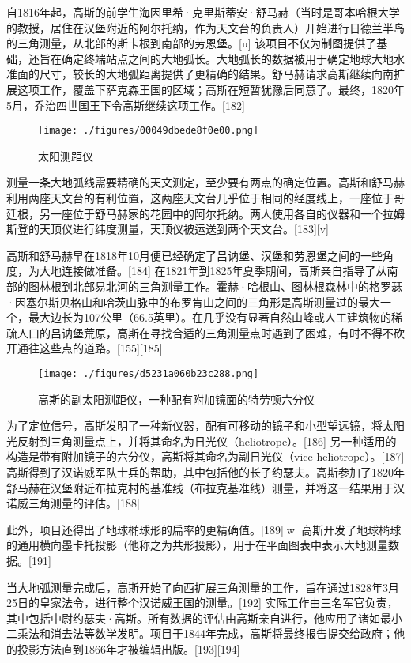 自1816年起，高斯的前学生海因里希·克里斯蒂安·舒马赫（当时是哥本哈根大学的教授，居住在汉堡附近的阿尔托纳，作为天文台的负责人）开始进行日德兰半岛的三角测量，从北部的斯卡根到南部的劳恩堡。[u] 该项目不仅为制图提供了基础，还旨在确定终端站点之间的大地弧长。大地弧长的数据被用于确定地球大地水准面的尺寸，较长的大地弧距离提供了更精确的结果。舒马赫请求高斯继续向南扩展这项工作，覆盖下萨克森王国的区域；高斯在短暂犹豫后同意了。最终，1820年5月，乔治四世国王下令高斯继续这项工作。[182]
\begin{figure}[ht]
\centering
\texttt{[image: ./figures/00049dbede8f0e00.png]}
\caption{太阳测距仪} \label{fig_KRGS_17}
\end{figure}
测量一条大地弧线需要精确的天文测定，至少要有两点的确定位置。高斯和舒马赫利用两座天文台的有利位置，这两座天文台几乎位于相同的经度线上，一座位于哥廷根，另一座位于舒马赫家的花园中的阿尔托纳。两人使用各自的仪器和一个拉姆斯登的天顶仪进行纬度测量，天顶仪被运送到两个天文台。[183][v]

高斯和舒马赫早在1818年10月便已经确定了吕讷堡、汉堡和劳恩堡之间的一些角度，为大地连接做准备。[184] 在1821年到1825年夏季期间，高斯亲自指导了从南部的图林根到北部易北河的三角测量工作。霍赫·哈根山、图林根森林中的格罗瑟·因塞尔斯贝格山和哈茨山脉中的布罗肯山之间的三角形是高斯测量过的最大一个，最大边长为107公里（66.5英里）。在几乎没有显著自然山峰或人工建筑物的稀疏人口的吕讷堡荒原，高斯在寻找合适的三角测量点时遇到了困难，有时不得不砍开通往这些点的道路。[155][185]
\begin{figure}[ht]
\centering
\texttt{[image: ./figures/d5231a060b23c288.png]}
\caption{高斯的副太阳测距仪，一种配有附加镜面的特劳顿六分仪} \label{fig_KRGS_18}
\end{figure}
为了定位信号，高斯发明了一种新仪器，配有可移动的镜子和小型望远镜，将太阳光反射到三角测量点上，并将其命名为日光仪（heliotrope）。[186] 另一种适用的构造是带有附加镜子的六分仪，高斯将其命名为副日光仪（vice heliotrope）。[187] 高斯得到了汉诺威军队士兵的帮助，其中包括他的长子约瑟夫。高斯参加了1820年舒马赫在汉堡附近布拉克村的基准线（布拉克基准线）测量，并将这一结果用于汉诺威三角测量的评估。[188]

此外，项目还得出了地球椭球形的扁率的更精确值。[189][w] 高斯开发了地球椭球的通用横向墨卡托投影（他称之为共形投影），用于在平面图表中表示大地测量数据。[191]

当大地弧测量完成后，高斯开始了向西扩展三角测量的工作，旨在通过1828年3月25日的皇家法令，进行整个汉诺威王国的测量。[192] 实际工作由三名军官负责，其中包括中尉约瑟夫·高斯。所有数据的评估由高斯亲自进行，他应用了诸如最小二乘法和消去法等数学发明。项目于1844年完成，高斯将最终报告提交给政府；他的投影方法直到1866年才被编辑出版。[193][194]

